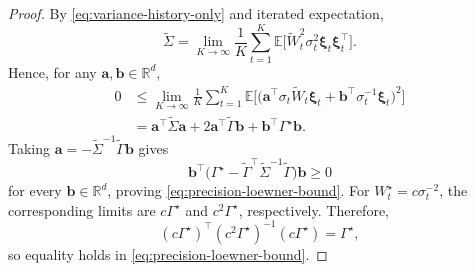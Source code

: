 \documentclass[12pt]{article}
\def\E{\mathbb{E}}
\numberwithin{equation}{section}
\begin{document}
\begin{proof}
By \eqref{eq:variance-history-only} and iterated expectation,
\begin{equation}
    \tilde\Sigma
    =
    \lim_{K\to\infty}
    \frac{1}{K}\sum_{t=1}^K
    \E\big[
        \tilde W_t^2\sigma_t^2
        \boldsymbol{\xi}_t\boldsymbol{\xi}_t^\top
    \big].
\end{equation}
Hence, for any $\boldsymbol{a},\boldsymbol{b}\in\mathbb R^d$,
\begin{equation}
\begin{aligned}
    0
    &\leq
    \lim_{K\to\infty}
    \frac{1}{K}\sum_{t=1}^K
    \E\big[
        \big(
            \boldsymbol{a}^\top
            \sigma_t\tilde W_t\boldsymbol{\xi}_t
            +
            \boldsymbol{b}^\top
            \sigma_t^{-1}\boldsymbol{\xi}_t
        \big)^2
    \big] \\
    &=
    \boldsymbol{a}^\top\tilde\Sigma\boldsymbol{a}
    +
    2\boldsymbol{a}^\top\tilde\Gamma\boldsymbol{b}
    +
    \boldsymbol{b}^\top\Gamma^\star\boldsymbol{b}.
\end{aligned}
\end{equation}
Taking $    \boldsymbol{a}
    =
    -\tilde\Sigma^{-1}
    \tilde\Gamma\boldsymbol{b}$ gives
\begin{equation}
    \boldsymbol{b}^\top
    \big(
        \Gamma^\star
        -
        {\tilde\Gamma^\top}
        \tilde\Sigma^{-1}
        \tilde\Gamma
    \big)
    \boldsymbol{b}
    \geq 0
\end{equation}
for every $\boldsymbol{b}\in\mathbb R^d$, proving
\eqref{eq:precision-loewner-bound}. For $W_t^\star=c\sigma_t^{-2}$, the
corresponding limits are $c\Gamma^\star$ and $c^2\Gamma^\star$, respectively.
Therefore,
\[
    {
    (c\Gamma^\star)^\top
    (c^2\Gamma^\star)^{-1}
    (c\Gamma^\star)
    =
    \Gamma^\star,}
\]
so equality holds in \eqref{eq:precision-loewner-bound}.
\end{proof}
\end{document}

